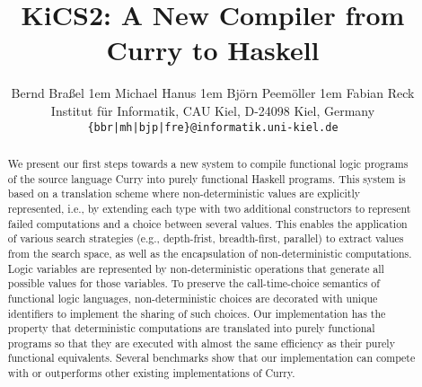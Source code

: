 \documentclass{scrartcl}
\begin{document}
\title{KiCS2: A New Compiler from Curry to Haskell}

\author{
Bernd Bra\ss{}el
\kern1em
Michael Hanus
\kern1em
 Bj{\"o}rn Peem{\"o}ller
\kern1em
Fabian Reck \\
Institut f{\"u}r Informatik, CAU Kiel, D-24098 Kiel, Germany \\
\texttt{\{bbr|mh|bjp|fre\}@informatik.uni-kiel.de}}
\date{}
\maketitle
\thispagestyle{empty}

\begin{abstract}
We present our first steps towards a new system to compile functional logic
programs of the source language Curry into purely functional Haskell programs.
This system is based on a translation scheme where non-deterministic values
are explicitly represented, i.e., by extending each type with two additional
constructors to represent failed computations and
a choice between several values.
This enables the application of various search
strategies (e.g., depth-frist, breadth-first, parallel) to extract values from
the search space, as well as the encapsulation of non-deterministic
computations.
Logic variables are represented by non-deterministic
operations that generate all possible values for those variables.
To preserve the call-time-choice semantics of functional logic languages,
non-deterministic choices are decorated with unique identifiers
to implement the sharing of such choices.
Our implementation has the property that
deterministic computations are translated into purely
functional programs so that they are executed with almost the same efficiency as
their purely functional equivalents. Several benchmarks show that our
implementation can compete with or outperforms other existing implementations
of Curry.
\end{abstract}
\end{document}
